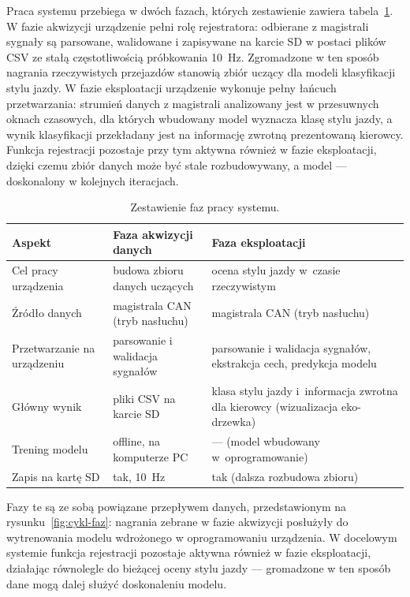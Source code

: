 Praca systemu przebiega w dwóch fazach, których zestawienie zawiera
tabela~\ref{tab:fazy-pracy}. W fazie akwizycji urządzenie pełni rolę
rejestratora: odbierane z magistrali sygnały są parsowane, walidowane
i zapisywane na karcie SD w postaci plików CSV ze stałą częstotliwością
próbkowania 10~Hz. Zgromadzone w ten sposób nagrania rzeczywistych przejazdów
stanowią zbiór uczący dla modeli klasyfikacji stylu jazdy. W fazie eksploatacji
urządzenie wykonuje pełny łańcuch przetwarzania: strumień danych
z magistrali analizowany jest w przesuwnych oknach czasowych, dla których
wbudowany model wyznacza klasę stylu jazdy, a wynik klasyfikacji przekładany
jest na informację zwrotną prezentowaną kierowcy. Funkcja rejestracji pozostaje
przy tym aktywna również w fazie eksploatacji, dzięki czemu zbiór danych może
być stale rozbudowywany, a model --- doskonalony w kolejnych iteracjach.

\begin{table}[!h]
    \centering
    \caption{Zestawienie faz pracy systemu.}
    \label{tab:fazy-pracy}
    \begin{tabular}{| p{3.6cm} | p{5.1cm} | p{5.1cm} |} \hline
        \textbf{Aspekt} & \textbf{Faza akwizycji danych} & \textbf{Faza eksploatacji} \\ \hline\hline
        Cel pracy urządzenia & budowa zbioru danych uczących & ocena stylu jazdy w~czasie rzeczywistym \\ \hline
        Źródło danych & magistrala CAN (tryb nasłuchu) & magistrala CAN (tryb nasłuchu) \\ \hline
        Przetwarzanie na urządzeniu & parsowanie i walidacja sygnałów & parsowanie i walidacja sygnałów, ekstrakcja cech, predykcja modelu \\ \hline
        Główny wynik & pliki CSV na karcie SD & klasa stylu jazdy i~informacja zwrotna dla kierowcy (wizualizacja eko-drzewka) \\ \hline
        Trening modelu & offline, na komputerze PC & --- (model wbudowany w~oprogramowanie) \\ \hline
        Zapis na kartę SD & tak, 10~Hz & tak (dalsza rozbudowa zbioru) \\ \hline
    \end{tabular}
\end{table}

Fazy te są ze sobą powiązane przepływem danych, przedstawionym na
rysunku~\ref{fig:cykl-faz}: nagrania zebrane w fazie akwizycji posłużyły do
wytrenowania modelu wdrożonego w oprogramowaniu urządzenia. W docelowym
systemie funkcja rejestracji pozostaje aktywna również w fazie eksploatacji,
działając równolegle do bieżącej oceny stylu jazdy --- gromadzone w ten
sposób dane mogą dalej służyć doskonaleniu modelu.

